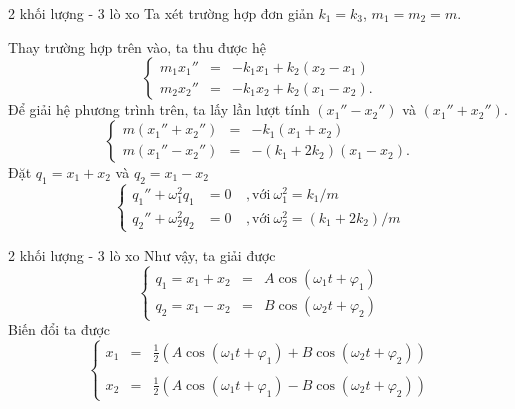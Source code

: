 \begin{frame}{2 khối lượng - 3 lò xo}
    Ta xét trường hợp đơn giản $k_1 = k_3$, $m_1 = m_2 = m$. 

    Thay trường hợp trên vào, ta thu được hệ
    \begin{equation}
    \left\{
    \begin{array}{ccc}
    m_1 x_1'' &=& - k_1 x_1 + k_2 (x_2 - x_1) \\
    m_2 x_2'' &=& - k_1 x_2 + k_2 (x_1 - x_2).
    \end{array}
    \right.
    \label{eq:3.1_2}
    \end{equation}
    Để giải hệ phương trình trên, ta lấy lần lượt tính $(x_1'' - x_2'')$ và $(x_1''+x_2'')$.
    \begin{equation}
    \left\{
        \begin{array}{ccc}
        m(x_1''+x_2'') &=& -k_1(x_1+x_2) \\
        m(x_1''-x_2'') &=& -(k_1+2k_2)(x_1 - x_2).
        \end{array}
    \right.
    \end{equation}
    Đặt \(q_1 = x_1 + x_2\) và \(q_2 = x_1 - x_2\)
    \begin{equation}
    \left\{
    \begin{array}{ccl}
    {q}_1'' + \omega_1^2 q_1 &= 0 & \ , \text{với} \ \omega_1^2 = k_1/m \\
    {q}_2'' + \omega_2^2 q_2 &= 0 & \ , \text{với} \ \omega_2^2 = (k_1+2k_2)/m
    \end{array}
    \right.
    \end{equation}
\end{frame}
\begin{frame}{2 khối lượng - 3 lò xo}
    Như vậy, ta giải được
    \begin{equation}
    \left\{ 
    \begin{array}{ccc}
    q_1 = x_1 + x_2 &=& A \cos{\left( \omega_1 t + \varphi_1\right)} \\
    q_2 = x_1 - x_2 &=& B \cos{\left( \omega_2 t + \varphi_2 \right)}
    \end{array}
    \right.
    \end{equation}
    Biến đổi ta được
    \begin{equation}
    \left\{ 
    \begin{array}{ccc}
    x_1 &=& \frac12 \left(A \cos{\left( \omega_1 t + \varphi_1\right)} + B \cos{\left( \omega_2 t + \varphi_2 \right)} \right) \\
    \\
    x_2 &=& \frac12 \left(A \cos{\left( \omega_1 t + \varphi_1\right)} - B \cos{\left( \omega_2 t + \varphi_2 \right)} \right)
    \end{array}
    \right.
    \end{equation}
\end{frame}